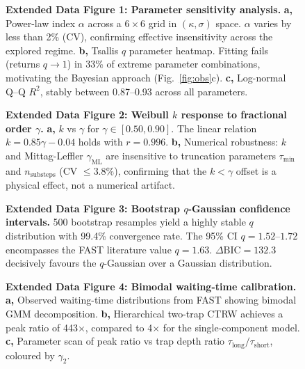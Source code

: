 \documentclass[twocolumn]{article}
\begin{document}
\begin{figure}[!ht]
\centering
\caption{\textbf{Extended Data Figure 1: Parameter sensitivity analysis.}
\textbf{a,} Power-law index $\alpha$ across a $6 \times 6$ grid in $(\kappa, \sigma)$ space. $\alpha$ varies by less than 2\% (CV), confirming effective insensitivity across the explored regime.
\textbf{b,} Tsallis $q$ parameter heatmap. Fitting fails (returns $q \to 1$) in 33\% of extreme parameter combinations, motivating the Bayesian approach (Fig.~\ref{fig:obs}c).
\textbf{c,} Log-normal Q--Q $R^2$, stably between 0.87--0.93 across all parameters.}
\label{fig:ed1}
\end{figure}

\begin{figure}[!ht]
\centering
\caption{\textbf{Extended Data Figure 2: Weibull $k$ response to fractional order $\gamma$.}
\textbf{a,} $k$ vs $\gamma$ for $\gamma \in [0.50, 0.90]$. The linear relation $k = 0.85\gamma - 0.04$ holds with $r = 0.996$.
\textbf{b,} Numerical robustness: $k$ and Mittag-Leffler $\gamma_{\mathrm{ML}}$ are insensitive to truncation parameters $\tau_{\min}$ and $n_{\mathrm{substeps}}$ (CV $\leq 3.8\%$), confirming that the $k < \gamma$ offset is a physical effect, not a numerical artifact.}
\label{fig:ed2}
\end{figure}

\begin{figure}[!ht]
\centering
\caption{\textbf{Extended Data Figure 3: Bootstrap $q$-Gaussian confidence intervals.}
500 bootstrap resamples yield a highly stable $q$ distribution with 99.4\% convergence rate. The 95\% CI $q = 1.52$--$1.72$ encompasses the FAST literature value $q = 1.63$. $\Delta\mathrm{BIC} = 132.3$ decisively favours the $q$-Gaussian over a Gaussian distribution.}
\label{fig:ed3}
\end{figure}

\begin{figure}[!ht]
\centering
\caption{\textbf{Extended Data Figure 4: Bimodal waiting-time calibration.}
\textbf{a,} Observed waiting-time distributions from FAST showing bimodal GMM decomposition.
\textbf{b,} Hierarchical two-trap CTRW achieves a peak ratio of 443$\times$, compared to 4$\times$ for the single-component model.
\textbf{c,} Parameter scan of peak ratio vs trap depth ratio $\tau_{\mathrm{long}}/\tau_{\mathrm{short}}$, coloured by $\gamma_2$.}
\label{fig:ed4}
\end{figure}
\end{document}
